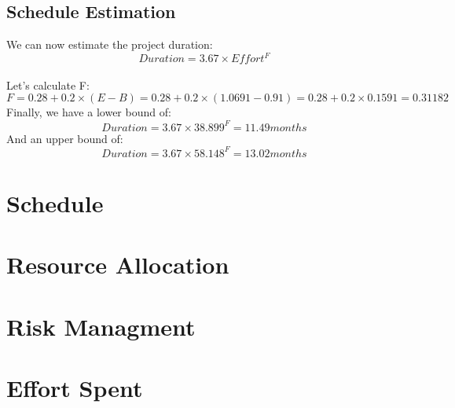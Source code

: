 \documentclass{article}
\begin{document}
\subsection{Schedule Estimation}
We can now estimate the project duration:\\
$$\displaystyle Duration = 3.67 \times Effort^F $$ \\
Let's calculate F:\\
$$\displaystyle F = 0.28 + 0.2 \times (E - B) = 0.28 + 0.2\times (1.0691 - 0.91) = 0.28 + 0.2\times 0.1591 = 0.31182 $$
Finally, we have a lower bound of:\\
$$\displaystyle Duration = 3.67 \times 38.899^F = 11.49 months $$ 
And an upper bound of:\\
$$\displaystyle Duration = 3.67 \times 58.148^F = 13.02 months $$ 
\newpage
\section{Schedule}

\newpage
\section{Resource Allocation}

\newpage
\section{Risk Managment}

\section{Effort Spent}
\end{document}
